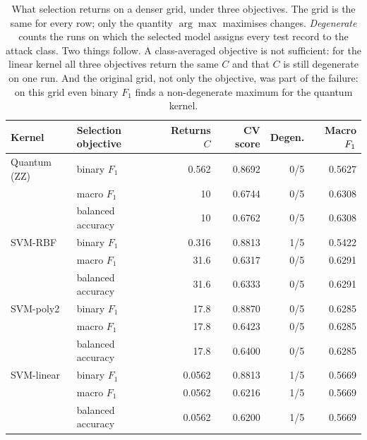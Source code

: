 \begin{table}[t]
\centering
\caption{What selection returns on a denser grid, under three
objectives. The grid is the same for every row; only the quantity
$\arg\max$ maximises changes. \emph{Degenerate} counts the runs on
which the selected model assigns every test record to the attack
class. Two things follow. A class-averaged objective is not
sufficient: for the linear kernel all three objectives return the
same $C$ and that $C$ is still degenerate on one run. And the
original grid, not only the objective, was part of the failure:
on this grid even binary $F_1$ finds a non-degenerate maximum for
the quantum kernel.}
\label{tab:objective}
\begin{tabular}{l@{\hskip 1.0em}l@{\hskip 1.4em}r@{\hskip 1.4em}r@{\hskip 1.4em}r@{\hskip 1.4em}r}
\toprule
Kernel & Selection objective & Returns $C$ & CV score & Degen. & Macro $F_1$ \\
\midrule
Quantum (ZZ) & binary $F_1$ & 0.562 & 0.8692 & 0/5 & 0.5627 \\
 & macro $F_1$ & 10 & 0.6744 & 0/5 & 0.6308 \\
 & balanced accuracy & 10 & 0.6762 & 0/5 & 0.6308 \\
\addlinespace[2pt]
SVM-RBF & binary $F_1$ & 0.316 & 0.8813 & 1/5 & 0.5422 \\
 & macro $F_1$ & 31.6 & 0.6317 & 0/5 & 0.6291 \\
 & balanced accuracy & 31.6 & 0.6333 & 0/5 & 0.6291 \\
\addlinespace[2pt]
SVM-poly2 & binary $F_1$ & 17.8 & 0.8870 & 0/5 & 0.6285 \\
 & macro $F_1$ & 17.8 & 0.6423 & 0/5 & 0.6285 \\
 & balanced accuracy & 17.8 & 0.6400 & 0/5 & 0.6285 \\
\addlinespace[2pt]
SVM-linear & binary $F_1$ & 0.0562 & 0.8813 & 1/5 & 0.5669 \\
 & macro $F_1$ & 0.0562 & 0.6216 & 1/5 & 0.5669 \\
 & balanced accuracy & 0.0562 & 0.6200 & 1/5 & 0.5669 \\
\bottomrule
\end{tabular}
\end{table}
